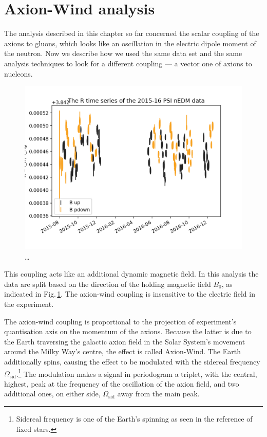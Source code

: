 \section{Axion-Wind analysis}
The analysis described in this chapter so far concerned the scalar coupling of the axions to gluons, which looks like an oscillation in the electric dipole moment of the neutron.
Now we describe how we used the same data set and the same analysis techniques to look for a different coupling --- a vector one of axions to nucleons.

\begin{figure}
  \centering
  \includegraphics[width=0.9\linewidth]{gfx/axions/winddeltah4mm_time_domain.png}
  \caption{\ldots}
  \label{fig:axions_wind_time_domain}
\end{figure}

This coupling acts like an additional dynamic magnetic field. In this analysis the data are split based on the direction of the holding magnetic field $B_0$, as indicated in Fig.\,\ref{fig:axions_wind_time_domain}. The axion-wind coupling is insensitive to the electric field in the experiment.

The axion-wind coupling  is proportional to the projection of experiment's quantisation axis on the momentum of the axions.
Because the latter is due to the Earth traversing the galactic axion field in the Solar System's movement around the Milky Way's centre, the effect is called Axion-Wind. 
The Earth additionally spins, causing the effect to be modulated with the sidereal frequency $\Omega_\mathrm{sid}$.\footnote{Sidereal frequency is one of the Earth's spinning as seen in the reference of fixed stars.}
The modulation makes a signal in periodogram a triplet, with the central, highest, peak at the frequency of the oscillation of the axion field, and two additional ones, on either side, $\Omega_\mathrm{sid}$ away from the main peak.

